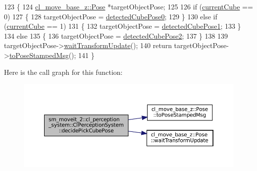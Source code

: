 \begin{DoxyCode}
123     \{
124         \hyperlink{classcl__move__base__z_1_1Pose}{cl\_move\_base\_z::Pose} *targetObjectPose;
125 
126         \textcolor{keywordflow}{if} (\hyperlink{classsm__moveit__2_1_1cl__perception__system_1_1ClPerceptionSystem_a88cc6bccad6938aa766511e79d16e69b}{currentCube} == 0)
127         \{
128             targetObjectPose = \hyperlink{classsm__moveit__2_1_1cl__perception__system_1_1ClPerceptionSystem_a7648943c3f878fcb315c27a206c72b46}{detectedCubePose0};
129         \}
130         \textcolor{keywordflow}{else} \textcolor{keywordflow}{if} (\hyperlink{classsm__moveit__2_1_1cl__perception__system_1_1ClPerceptionSystem_a88cc6bccad6938aa766511e79d16e69b}{currentCube} == 1)
131         \{
132             targetObjectPose = \hyperlink{classsm__moveit__2_1_1cl__perception__system_1_1ClPerceptionSystem_a04b9fd2836a5cc7d67bce87a097b236e}{detectedCubePose1};
133         \}
134         \textcolor{keywordflow}{else}
135         \{
136             targetObjectPose = \hyperlink{classsm__moveit__2_1_1cl__perception__system_1_1ClPerceptionSystem_a18008be2f058a2bb47dfd06c1d41da42}{detectedCubePose2};
137         \}
138 
139         targetObjectPose->\hyperlink{classcl__move__base__z_1_1Pose_a5f8576c3dacfb2f2e7f9df5105c480ea}{waitTransformUpdate}();
140         \textcolor{keywordflow}{return} targetObjectPose->\hyperlink{classcl__move__base__z_1_1Pose_a63887a88c1ac6e9a4a71b8d7d11aed6c}{toPoseStampedMsg}();
141     \}
\end{DoxyCode}
Here is the call graph for this function\+:
\nopagebreak
\begin{figure}[H]
\begin{center}
\leavevmode
\includegraphics[width=350pt]{classsm__moveit__2_1_1cl__perception__system_1_1ClPerceptionSystem_a5221513d70a59a00529dc32c9c0cbbfe_cgraph}
\end{center}
\end{figure}
\mbox{\label{classsm__moveit__2_1_1cl__perception__system_1_1ClPerceptionSystem_a7296c2e30c0c7401111c196e6043f26e}} 
